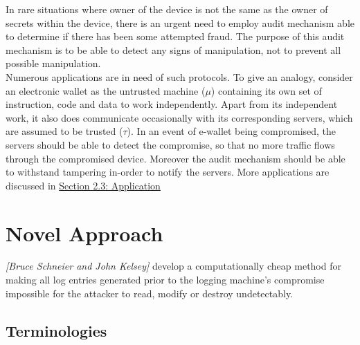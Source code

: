 \documentclass[12pt, letter]{article}
\newcommand\paperAuthors[2]{[#1 and #2]}
\newcommand\makePaperAuthors{\paperAuthors{Bruce Schneier}{John Kelsey}}
\begin{document}
In rare situations where owner of the device is not the same as the owner of secrets within the device, there is an urgent need to employ audit mechanism able to determine if there has been some attempted fraud. The purpose of this audit mechanism is to be able to detect any signs of manipulation, not to prevent all possible manipulation.\\

Numerous applications are in need of such protocols. To give an analogy, consider an electronic wallet as the untrusted machine ($\mu$) containing its own set of instruction, code and data to work independently. Apart from its independent work, it also does communicate occasionally with its corresponding servers, which are assumed to be trusted ($\tau$). In an event of e-wallet being compromised, the servers should be able to detect the compromise, so that no more traffic flows through the compromised device. Moreover the audit mechanism should be able to withstand tampering in-order to notify the servers. More applications are discussed in \hyperref[sec:application]{Section 2.3: Application}


\section{Novel Approach}

\textit{\makePaperAuthors} develop a computationally cheap method for making all log entries generated prior to the logging machine’s compromise impossible for the attacker to read, modify or destroy undetectably.

\subsection{Terminologies}
\end{document}
